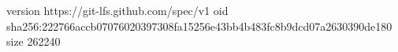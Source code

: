 version https://git-lfs.github.com/spec/v1
oid sha256:222766accb07076020397308fa15256e43bb4b483fc8b9dcd07a2630390de180
size 262240
